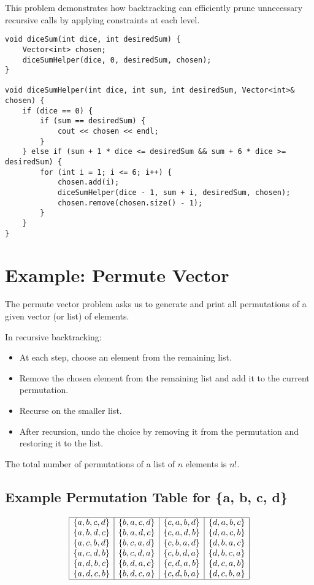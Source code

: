 \documentclass{article}
\begin{document}
This problem demonstrates how backtracking can efficiently prune unnecessary recursive calls by applying constraints at each level.



\begin{lstlisting}[style=cppstyle]
void diceSum(int dice, int desiredSum) {
    Vector<int> chosen;
    diceSumHelper(dice, 0, desiredSum, chosen);
}

void diceSumHelper(int dice, int sum, int desiredSum, Vector<int>& chosen) {
    if (dice == 0) {
        if (sum == desiredSum) {
            cout << chosen << endl;
        }
    } else if (sum + 1 * dice <= desiredSum && sum + 6 * dice >= desiredSum) {
        for (int i = 1; i <= 6; i++) {
            chosen.add(i);
            diceSumHelper(dice - 1, sum + i, desiredSum, chosen);
            chosen.remove(chosen.size() - 1);
        }
    }
}
\end{lstlisting}

\section{Example: Permute Vector}

The permute vector problem asks us to generate and print all permutations of a given vector (or list) of elements.  

In recursive backtracking:
\begin{itemize}
    \item At each step, choose an element from the remaining list.
    \item Remove the chosen element from the remaining list and add it to the current permutation.
    \item Recurse on the smaller list.
    \item After recursion, undo the choice by removing it from the permutation and restoring it to the list.
\end{itemize}

The total number of permutations of a list of $n$ elements is $n!$.


\subsection*{Example Permutation Table for \{a, b, c, d\}}

\[
\begin{array}{|c|c|c|c|}
\hline
\{a, b, c, d\} & \{b, a, c, d\} & \{c, a, b, d\} & \{d, a, b, c\} \\
\{a, b, d, c\} & \{b, a, d, c\} & \{c, a, d, b\} & \{d, a, c, b\} \\
\{a, c, b, d\} & \{b, c, a, d\} & \{c, b, a, d\} & \{d, b, a, c\} \\
\{a, c, d, b\} & \{b, c, d, a\} & \{c, b, d, a\} & \{d, b, c, a\} \\
\{a, d, b, c\} & \{b, d, a, c\} & \{c, d, a, b\} & \{d, c, a, b\} \\
\{a, d, c, b\} & \{b, d, c, a\} & \{c, d, b, a\} & \{d, c, b, a\} \\
\hline
\end{array}
\]
\end{document}
